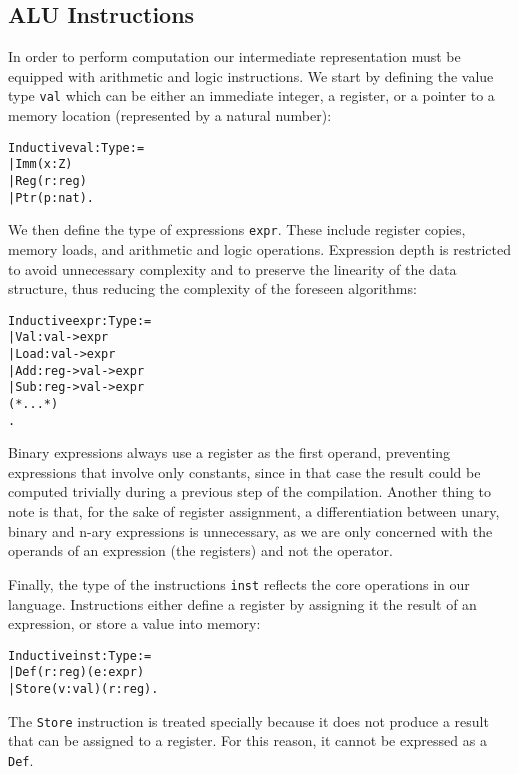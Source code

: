 \subsection{ALU Instructions}

In order to perform computation our intermediate representation must be equipped with arithmetic and logic instructions.
We start by defining the value type \texttt{val} which can be either an immediate integer, a register, or a pointer to a memory location (represented by a natural number):

\begin{alltt}
Inductive val : Type :=
  | Imm (x : Z)
  | Reg (r : reg)
  | Ptr (p : nat).
\end{alltt}

We then define the type of expressions \texttt{expr}. These include register copies, memory loads, and arithmetic and logic operations. Expression depth is restricted to avoid unnecessary complexity and to preserve the linearity of the data structure, thus reducing the complexity of the foreseen algorithms:

\begin{alltt}
Inductive expr : Type :=
  | Val : val -> expr
  | Load : val -> expr
  | Add : reg -> val -> expr
  | Sub : reg -> val -> expr
  (* ... *)
.
\end{alltt}

Binary expressions always use a register as the first operand, preventing expressions that involve only constants, since in that case the result could be computed trivially during a previous step of the compilation. Another thing to note is that, for the sake of register assignment, a differentiation between unary, binary and n-ary expressions is unnecessary, as we are only concerned with the operands of an expression (the registers) and not the operator.

Finally, the type of the instructions \texttt{inst} reflects the core operations in our language. Instructions either define a register by assigning it the result of an expression, or store a value into memory:

\begin{alltt}
Inductive inst : Type :=
  | Def (r : reg) (e : expr)
  | Store (v : val) (r : reg).
\end{alltt}

The \texttt{Store} instruction is treated specially because it does not produce a result that can be assigned to a register. For this reason, it cannot be expressed as a \texttt{Def}.

